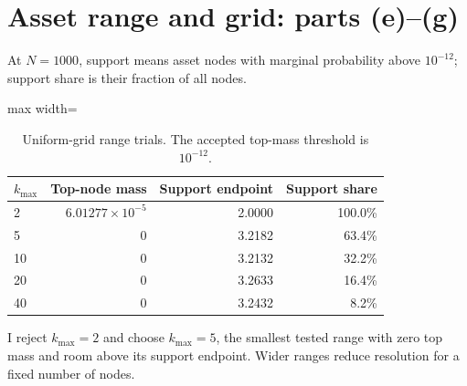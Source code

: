 \documentclass[10pt]{article}
\begin{document}
\section{Asset range and grid: parts (e)--(g)}
At $N=1000$, support means asset nodes with marginal probability above $10^{-12}$;
support share is their fraction of all nodes.
\begin{table}[H]\centering\small
\caption{Uniform-grid range trials. The accepted top-mass threshold is $10^{-12}$.}\label{tab:ranges}
\begin{adjustbox}{max width=\linewidth}
\begin{tabular}{lrrr}
\toprule
$k_{\max}$ & Top-node mass & Support endpoint & Support share \\
\midrule
2 & $6.01277\times10^{-5}$ & 2.0000 & 100.0\% \\
5 & 0 & 3.2182 & 63.4\% \\
10 & 0 & 3.2132 & 32.2\% \\
20 & 0 & 3.2633 & 16.4\% \\
40 & 0 & 3.2432 & 8.2\% \\
\bottomrule
\end{tabular}
\end{adjustbox}\end{table}
I reject $k_{\max}=2$ and choose $k_{\max}=5$, the smallest tested range with
zero top mass and room above its support endpoint. Wider ranges reduce resolution
for a fixed number of nodes.
\end{document}

